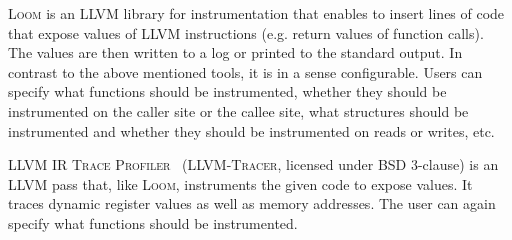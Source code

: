 \textsc{Loom} is an LLVM library for instrumentation that enables to insert
lines of code that expose values of LLVM instructions (e.g. return values of
function calls). The values are then written to a log or printed to the
standard output. In contrast to the above mentioned tools, it is in a sense
configurable. Users can specify what functions should be instrumented, whether
they should be instrumented on the caller site or the callee site, what
structures should be instrumented and whether they should be instrumented on
reads or writes, etc.

\textsc{LLVM IR Trace Profiler}~\cite{tracer} (\textsc{LLVM-Tracer}, licensed
under BSD 3-clause) is an LLVM pass that, like \textsc{Loom}, instruments the
given code to expose values. It traces dynamic register values as well as
memory addresses. The user can again specify what functions should be
instrumented. 

